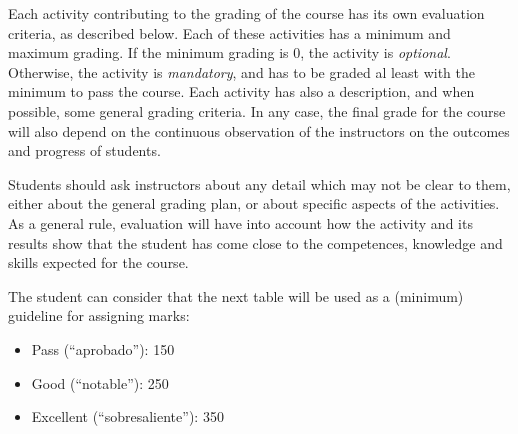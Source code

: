\documentclass[a4paper]{article}
\begin{document}
Each activity contributing to the grading of the course has its own evaluation criteria, 
as described below. Each of these activities has a minimum and maximum grading. If the 
minimum grading is 0, the activity is \textit{optional}. Otherwise, the activity is \textit{mandatory}, and 
has to be graded al least with the minimum to pass the course. Each activity has also a 
description, and when possible, some general grading criteria. In any case, the final grade 
for the course will also depend on the continuous observation of the instructors on the 
outcomes and progress of students.

Students should ask instructors about any detail which may not be clear to them, 
either about the general grading plan, or about specific aspects of the activities. 
As a general rule, evaluation will have into account how the activity and its results 
show that the student has come close to the competences, knowledge and skills expected 
for the course.

The student can consider that the next table will be used as a (minimum) guideline for 
assigning marks:

\begin{itemize}
\item Pass (``aprobado''): 150
\item Good (``notable''): 250
\item Excellent (``sobresaliente''): 350
\end{itemize}
\end{document}

